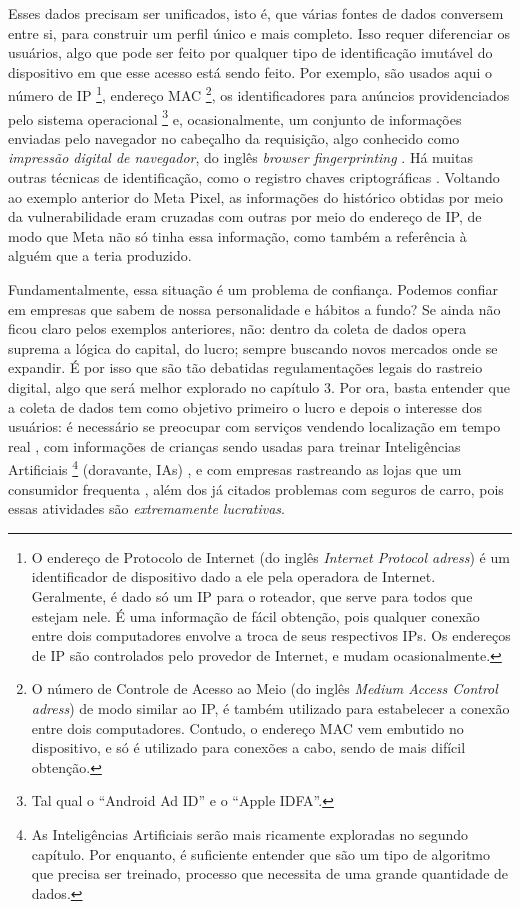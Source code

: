Esses dados precisam ser unificados, isto é, que várias fontes de dados conversem entre si, para construir um perfil único e mais completo.
Isso requer diferenciar os usuários, algo que pode ser feito por qualquer tipo de identificação imutável do dispositivo em que esse acesso está sendo feito.
Por exemplo, são usados aqui o número de IP \footnote{O endereço de Protocolo de Internet (do inglês \textit{Internet Protocol adress}) é um identificador de dispositivo dado a ele pela operadora de Internet. Geralmente, é dado só um IP para o roteador, que serve para todos que estejam nele. É uma informação de fácil obtenção, pois qualquer conexão entre dois computadores envolve a troca de seus respectivos IPs. Os endereços de IP são controlados pelo provedor de Internet, e mudam ocasionalmente.}, endereço MAC \footnote{O número de Controle de Acesso ao Meio (do inglês \textit{Medium Access Control adress}) de modo similar ao IP, é também utilizado para estabelecer a conexão entre dois computadores. Contudo, o endereço MAC vem embutido no dispositivo, e só é utilizado para conexões a cabo, sendo de mais difícil obtenção.}, os identificadores para anúncios providenciados pelo sistema operacional \footnote{Tal qual o {``Android Ad ID''} e o {``Apple IDFA''}.} e, ocasionalmente, um conjunto de informações enviadas pelo navegador no cabeçalho da requisição, algo conhecido como \textit{impressão digital de navegador}, do inglês \textit{browser fingerprinting} \cite{ohm_broken_2009, chen_fingerprinting_2019}.
Há muitas outras técnicas de identificação, como o registro chaves criptográficas \cite{sy_tracking_2018}.
Voltando ao exemplo anterior do Meta Pixel, as informações do histórico obtidas por meio da vulnerabilidade eram cruzadas com outras por meio do endereço de IP, de modo que Meta não só tinha essa informação, como também a referência à alguém que a teria produzido.

Fundamentalmente, essa situação é um problema de confiança.
Podemos confiar em empresas que sabem de nossa personalidade e hábitos a fundo?
Se ainda não ficou claro pelos exemplos anteriores, não: dentro da coleta de dados opera suprema a lógica do capital, do lucro; sempre buscando novos mercados onde se expandir.
É por isso que são tão debatidas regulamentações legais do rastreio digital, algo que será melhor explorado no capítulo 3.
Por ora, basta entender que a coleta de dados tem como objetivo primeiro o lucro e depois o interesse dos usuários: é necessário se preocupar com serviços vendendo localização em tempo real \cite{mackey_eff_2019}, com informações de crianças sendo usadas para treinar Inteligências Artificiais \footnote{As Inteligências Artificiais serão mais ricamente exploradas no segundo capítulo. Por enquanto, é suficiente entender que são um tipo de algoritmo que precisa ser treinado, processo que necessita de uma grande quantidade de dados.} (doravante, IAs) \cite{schurig_meta_2024}, e com empresas rastreando as lojas que um consumidor frequenta \cite{soltani_privacy_2015}, além dos já citados problemas com seguros de carro, pois essas atividades são \textit{extremamente lucrativas}.

